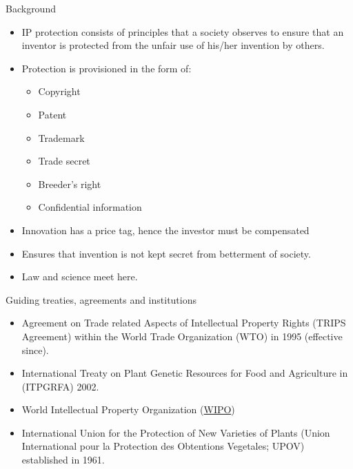 \documentclass[
  ignorenonframetext,
  aspectratio=169]{beamer}
\providecommand{\tightlist}{%
  \setlength{\itemsep}{0pt}\setlength{\parskip}{0pt}}
\begin{document}
\begin{frame}{Background}
\protect\hypertarget{background-1}{}
\begin{itemize}
\tightlist
\item
  IP protection consists of principles that a society observes to ensure
  that an inventor is protected from the unfair use of his/her invention
  by others.
\item
  Protection is provisioned in the form of:

  \begin{itemize}
  \tightlist
  \item
    Copyright
  \item
    Patent
  \item
    Trademark
  \item
    Trade secret
  \item
    Breeder's right
  \item
    Confidential information
  \end{itemize}
\item
  Innovation has a price tag, hence the investor must be compensated
\item
  Ensures that invention is not kept secret from betterment of society.
\item
  Law and science meet here.
\end{itemize}
\end{frame}

\begin{frame}{Guiding treaties, agreements and institutions}
\protect\hypertarget{guiding-treaties-agreements-and-institutions}{}
\begin{itemize}
\tightlist
\item
  Agreement on Trade related Aspects of Intellectual Property Rights
  (TRIPS Agreement) within the World Trade Organization (WTO) in 1995
  (effective since).
\item
  International Treaty on Plant Genetic Resources for Food and
  Agriculture in (ITPGRFA) 2002.
\item
  World Intellectual Property Organization
  (\href{https://www.wipo.int/portal/en/index.html}{WIPO})
\item
  International Union for the Protection of New Varieties of Plants
  (Union International pour la Protection des Obtentions Vegetales;
  UPOV) established in 1961.
\end{itemize}
\end{frame}
\end{document}
